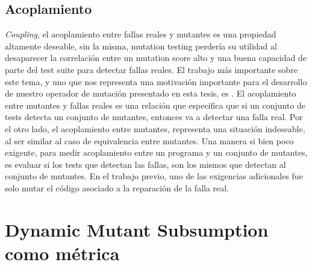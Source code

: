 \subsection{Acoplamiento}

\emph{Coupling}, el acoplamiento entre fallas reales y mutantes es una propiedad altamente deseable, sin la misma, mutation testing perder\'ia su utilidad al desaparecer la correlaci\'on entre un mutation score alto y una buena capacidad de parte del test suite para detectar fallas reales. El trabajo m\'as importante sobre este tema, y uno que nos representa una motivaci\'on importante para el desarrollo de nuestro operador de mutaci\'on presentado en esta tesis, es \cite{bibliography.mutation.evaluation.valid-substitute}. El acoplamiento entre mutantes y fallas reales es una relaci\'on que especifica que si un conjunto de tests detecta un conjunto de mutantes, entonces va a detectar una falla real. Por el otro lado, el acoplamiento entre mutantes, representa una situaci\'on indeseable, al ser similar al caso de equivalencia entre mutantes. Una manera si bien poco exigente, para medir acoplamiento entre un programa y un conjunto de mutantes, es evaluar si los tests que detectan las fallas, son los mismos que detectan al conjunto de mutantes. En el trabajo previo, uno de las exigencias adicionales fue solo mutar el c\'odigo asociado a la reparaci\'on de la falla real.

%

\section{Dynamic Mutant Subsumption como m\'etrica}
\label{sec:preliminares.mutation.whysubsumption}

